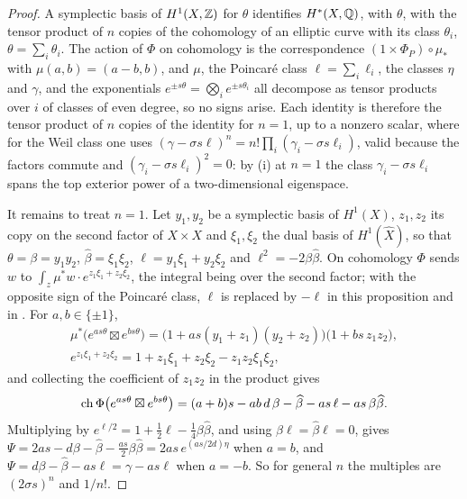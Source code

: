 \begin{proof}
A symplectic basis of $H^{1}(X,\mathbb{Z})$ for $\theta$ identifies $H^{*}(X,\mathbb{Q})$,
with $\theta$, with the tensor product of $n$ copies of the cohomology of an
elliptic curve with its class $\theta_{i}$, $\theta=\sum_{i}\theta_{i}$. The
action of $\Phi$ on cohomology is the correspondence $(1\times\Phi_{P})\circ
\mu_{*}$ with $\mu(a,b)=(a-b,b)$, and $\mu$, the Poincar\'e class
$\ell=\sum_{i}\ell_{i}$, the classes $\eta$ and $\gamma$, and the exponentials
$e^{\pm s\theta}=\bigotimes_{i}e^{\pm s\theta_{i}}$ all decompose as tensor
products over $i$ of classes of even degree, so no signs arise. Each identity
is therefore the tensor product of $n$ copies of the identity for $n=1$, up to
a nonzero scalar, where for the Weil class one uses
$(\gamma-\sigma s\ell)^{n}=n!\prod_{i}(\gamma_{i}-\sigma s\ell_{i})$, valid because
the factors commute and $(\gamma_{i}-\sigma s\ell_{i})^{2}=0$: by
(i) at $n=1$ the class $\gamma_{i}-\sigma s\ell_{i}$
spans the top exterior power of a two-dimensional eigenspace.

It remains to treat $n=1$. Let $y_{1},y_{2}$ be a symplectic basis of
$H^{1}(X)$, $z_{1},z_{2}$ its copy on the second factor of $X\times X$ and
$\xi_{1},\xi_{2}$ the dual basis of $H^{1}(\widehat X)$, so that
$\theta=\beta=y_{1}y_{2}$, $\widehat\beta=\xi_{1}\xi_{2}$,
$\ell=y_{1}\xi_{1}+y_{2}\xi_{2}$ and $\ell^{2}=-2\beta\widehat\beta$. On
cohomology $\Phi$ sends $w$ to $\int_{z}\mu^{*}w\cdot e^{z_{1}\xi_{1}+z_{2}\xi_{2}}$,
the integral being over the second factor; with the opposite sign of the
Poincar\'e class, $\ell$ is replaced by $-\ell$ in this proposition and in
. For $a,b\in\{\pm1\}$,
\begin{gather*}
  \mu^{*}\bigl(e^{as\theta}\boxtimes e^{bs\theta}\bigr)
  =\bigl(1+as(y_{1}+z_{1})(y_{2}+z_{2})\bigr)\bigl(1+bs\,z_{1}z_{2}\bigr),\\
  e^{z_{1}\xi_{1}+z_{2}\xi_{2}}=1+z_{1}\xi_{1}+z_{2}\xi_{2}-z_{1}z_{2}\xi_{1}\xi_{2},
\end{gather*}
and collecting the coefficient of $z_{1}z_{2}$ in the product gives
\[
  \operatorname{ch}\Phi\bigl(e^{as\theta}\boxtimes e^{bs\theta}\bigr)
  =(a+b)s-ab\,d\,\beta-\widehat\beta-as\,\ell-as\,\beta\widehat\beta .
\]
Multiplying by $e^{\ell/2}=1+\frac12\ell-\frac14\beta\widehat\beta$, and using
$\beta\ell=\widehat\beta\ell=0$, gives
$\Psi=2as-d\beta-\widehat\beta-\frac{as}{2}\beta\widehat\beta=2as\,e^{(as/2d)\eta}$
when $a=b$, and $\Psi=d\beta-\widehat\beta-as\ell=\gamma-as\ell$ when $a=-b$.
So for general $n$ the multiples are $(2\sigma s)^{n}$ and $1/n!$.


\end{proof}
